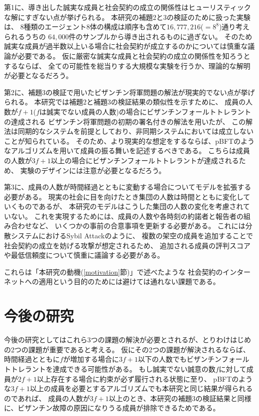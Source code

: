 第1に、導き出した誠実な成員と社会契約の成立の関係性はヒューリスティックな解にすぎない点が挙げられる。
本研究の補題2と3の検証のために扱った実験は、
8種類のエージェント8体の構成は順序も含めて$16,777,216$($=8^8$)通り考えられるうちの
$64,000$件のサンプルから導き出されるものに過ぎない。
そのため誠実な成員が過半数以上いる場合に社会契約が成立するのかについては慎重な議論が必要である。
仮に厳密な誠実な成員と社会契約の成立の関係性を知ろうとするならば、
全ての可能性を総当りする大規模な実験を行うか、理論的な解明が必要となるだろう。

第2に、補題3の検証で用いたビザンチン将軍問題の解法が現実的でない点が挙げられる。
本研究では補題2と補題3の検証結果の類似性を示すために、
成員の人数が$f+1$($f$は誠実でない成員の人数)の場合にビザンチンフォールトトレラントの達成される
ビザンチン将軍問題の初期の署名付きの解法\cite{lamport1982}を用いたが、
この解法は同期的なシステムを前提としており、非同期システムにおいては成立しないことが知られている。\cite{fischer1985}
そのため、より現実的な想定をするならば、pBFTのようなアルゴリズムを用いて成員の振る舞いを記述するべきである。\cite{castro1999}
こちらは成員の人数が$3f+1$以上の場合にビザンチンフォールトトレラントが達成されるため、
実験のデザインには注意が必要となるだろう。

第3に、成員の人数が時間経過とともに変動する場合についてモデルを拡張する必要がある。
現実の社会に目を向けたとき集団の人数は時間とともに変化していくものであるが、
本研究のモデルはこうした集団の人数の変化を考慮されていない。
これを実現するためには、成員の人数や各時刻の約諾者と報告者の組み合わせなど、
いくつかの事前の合意事項を更新する必要がある。
これには分散システムにおけるSybil Attack\cite{douceur2002}のように、
複数の架空の成員を追加することで社会契約の成立を妨げる攻撃が想定されるため、
追加される成員の評判スコアや最低信頼度について慎重に議論する必要がある。

これらは「本研究の動機(\ref{motivation}節)」で述べたような
社会契約のインターネットへの適用という目的のためには避けては通れない課題である。

\section{今後の研究}
今後の研究としてはこれら3つの課題の解決が必要とされるが、とりわけはじめの2つの課題が重要であると考える。
仮にその2つの課題が解決されるならば、
時間経過とともに$f$が増加する場合に$3f+1$以下の人数でもビザンチンフォールトトレラントを達成できる可能性がある。
もし誠実でない誠意の数$f$に対して成員が$2f+1$以上存在する場合に約束が必ず履行される状態に至り、
pBFT\cite{castro1999}のような$3f+1$以上の成員を必要とするアルゴリズムでも本研究と同じ結果が得られるのであれば、
成員の人数が$3f+1$以上のとき、本研究の補題3の検証結果と同様に、ビザンチン故障の原因になりうる成員が排除できるためである。

